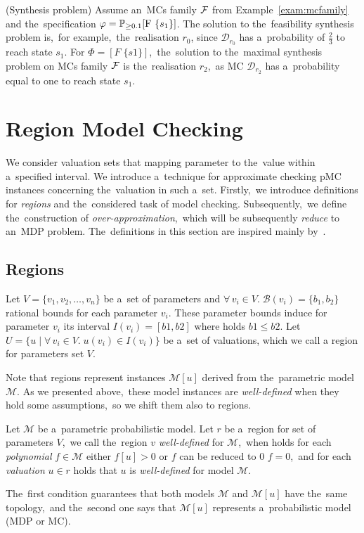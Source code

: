 \begin{example} (Synthesis problem)
Assume an~MCs family $\mathcal{F}$ from Example~\ref{exam:mcfamily} and the~specification $\varphi = \mathbb{P}_{\geq 0.1}[\mathrm{F}\ \{s_1\}]$.
The solution to the~feasibility synthesis problem is,~for example,~the~realisation $r_0$, since $\mathcal{D}_{r_0}$ has a~probability of $\frac{2}{3}$ to reach state $s_1$.
For $\varPhi = [F \; \{s1\}]$,~the~solution to the~maximal synthesis problem on MCs family $\mathcal{F}$ is the~realisation $r_2$,~as MC $\mathcal{D}_{r_2}$ has a~probability equal to one to reach state $s_1$.
\end{example}

\section{Region Model Checking}
We consider valuation sets that mapping parameter to the~value within a~specified interval. 
We introduce a~technique for approximate checking pMC instances concerning the~valuation in such a~set.
Firstly,~we introduce definitions for \textit{regions} and the~considered task of model checking.
Subsequently,~we define the~construction of \textit{over-approximation},~which will be subsequently \textit{reduce} to an~MDP problem.
The~definitions in this section are inspired mainly by~\cite{Quatmann2016}.

\subsection{Regions}
\begin{definition}[Region]
Let $V = \{ v_1, v_2, \dots, v_n \}$ be a~set of parameters and $\forall \, v_i \in V. \; \mathcal{B}(v_i) = \{b_1, b_2 \}$ rational bounds for each parameter $v_i$.
These parameter bounds induce for parameter $v_i$ its interval $I(v_i) = [b1, b2]$ where holds $b1 \leq b2$.
Let $U = \{ u \; \lvert \; \forall \, v_i \in V. \; u(v_i) \in I(v_i) \}$ be a~set of valuations, which we call a region for parameters set $V$.
\end{definition}
\noindent
Note that regions represent instances $\mathcal{M}[u]$ derived from the~parametric model $\mathcal{M}$.
As we presented above,~these model instances are \textit{well-defined} when they hold some assumptions,~so we shift them also to regions.

\begin{definition}
Let $\mathcal{M}$ be a~parametric probabilistic model.
Let $r$ be a~region for set of parameters $V$,~we call the~region $v$ \textit{well-defined} for $\mathcal{M}$,~when holds for each \textit{polynomial} $f \in \mathcal{M}$ either $f[u] > 0$ or  $f$ can be reduced to 0 $f = 0$,~and for each \textit{valuation} $u \in r$ holds that $u$ is \textit{well-defined} for model $\mathcal{M}$.
\end{definition}
\noindent
The~first condition guarantees that both models $\mathcal{M}$ and $\mathcal{M}[u]$ have the~same topology,~and the~second one says that $\mathcal{M}[u]$ represents a~probabilistic model (MDP or MC).

